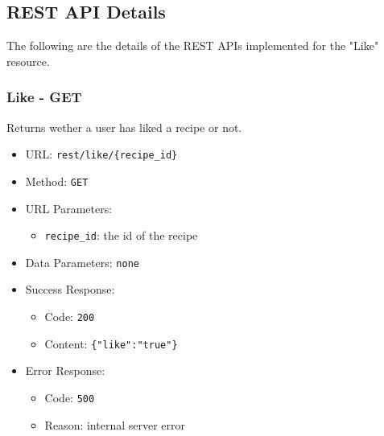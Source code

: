 \subsection{REST API Details}

The following are the details of the REST APIs implemented for the "Like" resource.

\subsubsection*{Like - GET}
Returns wether a user has liked a recipe or not.
\begin{itemize}
    \item URL: \texttt{rest/like/\{recipe\_id\}}
    \item Method: \texttt{GET}
    \item URL Parameters:
    \begin{itemize}
        \item \texttt{recipe\_id}: the id of the recipe
    \end{itemize}
    \item Data Parameters: \texttt{none}
    \item Success Response:
    \begin{itemize}
        \item Code: \texttt{200}
        \item Content: \texttt{\{"like":"true"\}}
    \end{itemize}
    \item Error Response:
    \begin{itemize}
        \item Code: \texttt{500}
        \item Reason: internal server error
    \end{itemize}
\end{itemize}

